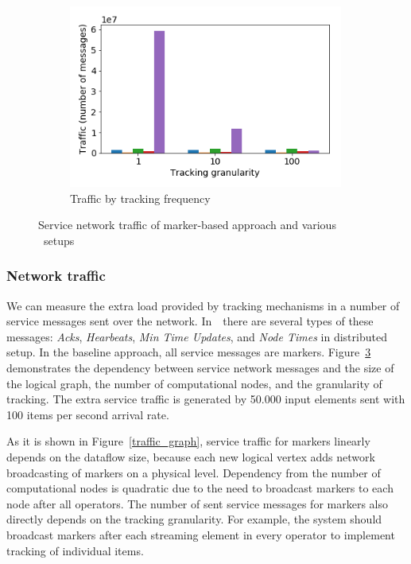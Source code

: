 \begin{figure}[t!]
\begin{subfigure}[b]{0.32\textwidth}
            \label{traffic_machines}
    \end{subfigure}
    \hspace{5mm}
    \begin{subfigure}[b]{0.32\textwidth}
            \includegraphics[width=0.99\textwidth]{pics/traffic_by_tracking_frequency_bars.png}
            \caption{Traffic by tracking frequency}
            \label{traffic_granularity}
	\end{subfigure}
    \caption{Service network traffic of marker-based approach and various \tracker\ setups}
    \label{traffic_plots}
\end{figure}

\subsubsection{Network traffic}

We can measure the extra load provided by tracking mechanisms in a number of service messages sent over the network. In~\tracker\ there are several types of these messages: {\em Acks}, {\em Hearbeats}, {\em Min Time Updates}, and {\em Node Times} in distributed setup. In the baseline approach, all service messages are markers. Figure~\ref{traffic_plots} demonstrates the dependency between service network messages and the size of the logical graph, the number of computational nodes, and the granularity of tracking. The extra service traffic is generated by 50.000 input elements sent with 100 items per second arrival rate. 

As it is shown in Figure~\ref{traffic_graph}, service traffic for markers linearly depends on the dataflow size, because each new logical vertex adds network broadcasting of markers on a physical level. Dependency from the number of computational nodes is quadratic due to the need to broadcast markers to each node after all operators. The number of sent service messages for markers also directly depends on the tracking granularity. For example, the system should broadcast markers after each streaming element in every operator to implement tracking of individual items. 

